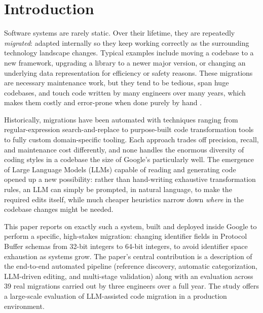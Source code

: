 \section{Introduction}

Software systems are rarely static. Over their lifetime, they are
repeatedly \emph{migrated}: adapted internally so they keep working
correctly as the surrounding technology landscape changes. Typical
examples include moving a codebase to a new framework, upgrading a
library to a newer major version, or changing an underlying data
representation for efficiency or safety reasons. These migrations are
necessary maintenance work, but they tend to be tedious, span huge
codebases, and touch code written by many engineers over many years,
which makes them costly and error-prone when done purely by hand
\cite{hora2015developers, kula2018developers}.

Historically, migrations have been automated with techniques ranging
from regular-expression search-and-replace to purpose-built code
transformation tools to fully custom domain-specific tooling. Each
approach trades off precision, recall, and maintenance cost
differently, and none handles the enormous diversity of coding styles
in a codebase the size of Google's particularly well. The emergence
of Large Language Models (LLMs) capable of reading and generating
code opened up a new possibility: rather than hand-writing exhaustive
transformation rules, an LLM can simply be prompted, in natural
language, to make the required edits itself, while much cheaper
heuristics narrow down \emph{where} in the codebase changes might be
needed.

This paper reports on exactly such a system, built and deployed
inside Google to perform a specific, high-stakes migration: changing
identifier fields in Protocol Buffer schemas from 32-bit integers to
64-bit integers, to avoid identifier space exhaustion as systems grow.
The paper's central contribution is a description of the end-to-end
automated pipeline (reference discovery, automatic categorization,
LLM-driven editing, and multi-stage validation) along with an
evaluation across 39 real migrations carried out by three engineers
over a full year. The study offers a large-scale evaluation of
LLM-assisted code migration in a production environment.
